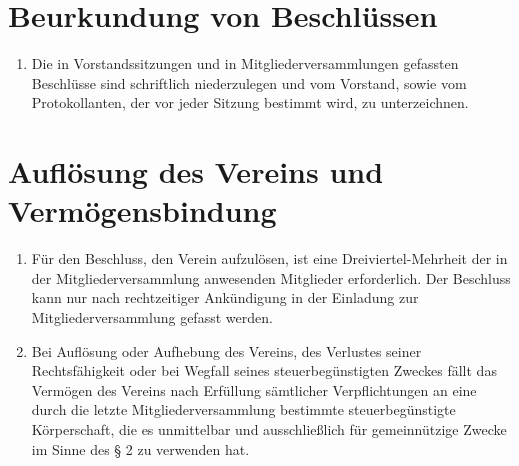 \documentclass[a4paper,12pt]{scrartcl}
\begin{document}
\section{Beurkundung von Beschlüssen}
\begin{enumerate}
  \item Die in Vorstandssitzungen und in Mitgliederversammlungen gefassten
    Beschlüsse sind schriftlich niederzulegen und vom Vorstand, sowie vom
    Protokollanten, der vor jeder Sitzung bestimmt wird, zu unterzeichnen.
\end{enumerate}

\section{Auflösung des Vereins und Vermögensbindung}
\begin{enumerate}
  \item Für den Beschluss, den Verein aufzulösen, ist eine Dreiviertel-Mehrheit
    der in der Mitgliederversammlung anwesenden Mitglieder erforderlich. Der
    Beschluss kann nur nach rechtzeitiger Ankündigung in der Einladung zur
    Mitgliederversammlung gefasst werden.
  \item Bei Auflösung oder Aufhebung des Vereins, des Verlustes seiner
      Rechtsfähigkeit oder bei Wegfall seines steuerbegünstigten Zweckes fällt
      das Vermögen des Vereins nach Erfüllung sämtlicher Verpflichtungen an
      eine durch die letzte Mitgliederversammlung bestimmte steuerbegünstigte
      Körperschaft, die es unmittelbar und ausschließlich für gemeinnützige
      Zwecke im Sinne des § 2 zu verwenden hat.
\end{enumerate}
\end{document}

